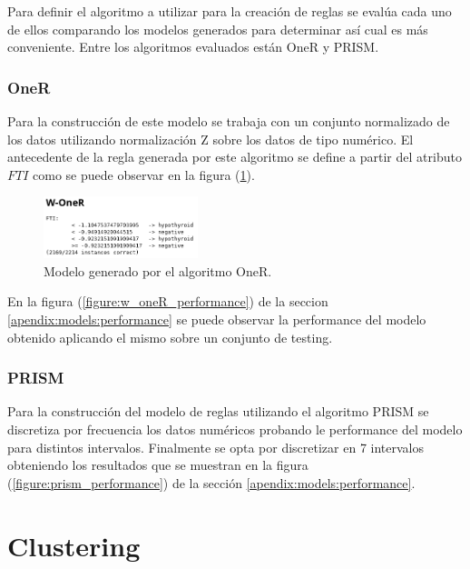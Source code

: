 \documentclass[osajnl,twocolumn,showpacs,superscriptaddress,10pt,floatfix]{revtex4-1} %
\begin{document}
Para definir el algoritmo a utilizar para la creación de reglas se evalúa cada uno de ellos comparando los modelos generados para determinar así cual es más conveniente. Entre los algoritmos evaluados están OneR y PRISM. \\

\subsubsection{OneR}

Para la construcción de este modelo se trabaja con un conjunto normalizado de los datos utilizando normalización Z sobre los datos de tipo numérico. El antecedente de la regla generada por este algoritmo se define a partir del atributo $FTI$ como se puede observar en la figura (\ref{figure:w_oneR}). \\

\begin{figure}[H]
    \centering
    \includegraphics[width=0.4\textwidth]{models/w_oneR}
    \caption{Modelo generado por el algoritmo OneR.}
    \label{figure:w_oneR}
\end{figure}

En la figura (\ref{figure:w_oneR_performance}) de la seccion \ref{apendix:models:performance} se puede observar la performance del modelo obtenido aplicando el mismo sobre un conjunto de testing. \\

\subsubsection{PRISM}

Para la construcción del modelo de reglas utilizando el algoritmo PRISM se discretiza por frecuencia los datos numéricos probando le performance del modelo para distintos intervalos. Finalmente se opta por discretizar en 7 intervalos obteniendo los resultados que se muestran en la figura (\ref{figure:prism_performance}) de la sección \ref{apendix:models:performance}. \\

\section{Clustering}
\end{document}
